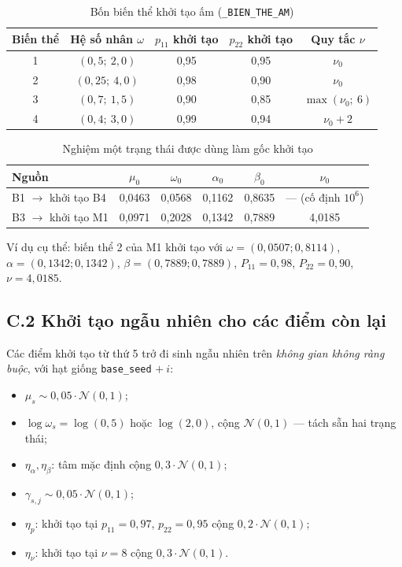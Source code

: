 \documentclass[11pt,a4paper]{article}
\begin{document}
\begin{table}[H]\centering\footnotesize
\caption{Bốn biến thể khởi tạo ấm (\texttt{\_BIEN\_THE\_AM})}
\begin{tabularx}{\textwidth}{c C C C C}
\toprule
\textbf{Biến thể} & \textbf{Hệ số nhân $\omega$} & \textbf{$p_{11}$ khởi tạo} & \textbf{$p_{22}$ khởi tạo} & \textbf{Quy tắc $\nu$} \\
 & $(0{,}5;\ 2{,}0)$ & 0{,}95 & 0{,}95 & $\nu_0$ \\
2 & $(0{,}25;\ 4{,}0)$ & 0{,}98 & 0{,}90 & $\nu_0$ \\
3 & $(0{,}7;\ 1{,}5)$ & 0{,}90 & 0{,}85 & $\max(\nu_0;\ 6)$ \\
4 & $(0{,}4;\ 3{,}0)$ & 0{,}99 & 0{,}94 & $\nu_0+2$ \\
\bottomrule
\end{tabularx}
\end{table}


\begin{table}[H]\centering\footnotesize
\caption{Nghiệm một trạng thái được dùng làm gốc khởi tạo}
\begin{tabularx}{\textwidth}{l C C C C C}
\toprule
\textbf{Nguồn} & $\mu_0$ & $\omega_0$ & $\alpha_0$ & $\beta_0$ & $\nu_0$ \\
\midrule
B1 $\to$ khởi tạo B4 & 0{,}0463 & 0{,}0568 & 0{,}1162 & 0{,}8635 & --- (cố định $10^6$) \\
B3 $\to$ khởi tạo M1 & 0{,}0971 & 0{,}2028 & 0{,}1342 & 0{,}7889 & 4{,}0185 \\
\bottomrule
\end{tabularx}
\end{table}

Ví dụ cụ thể: biến thể 2 của M1 khởi tạo với
$\omega = (0{,}0507; 0{,}8114)$,
$\alpha = (0{,}1342; 0{,}1342)$,
$\beta = (0{,}7889; 0{,}7889)$,
$P_{11} = 0{,}98$, $P_{22} = 0{,}90$, $\nu = 4{,}0185$.

\subsection*{C.2 Khởi tạo ngẫu nhiên cho các điểm còn lại}
Các điểm khởi tạo từ thứ 5 trở đi sinh ngẫu nhiên trên \emph{không gian không ràng buộc},
với hạt giống \texttt{base\_seed} $+\ i$:
\begin{itemize}
  \item $\mu_s \sim 0{,}05\cdot\mathcal{N}(0,1)$;
  \item $\log\omega_s = \log(0{,}5)$ hoặc $\log(2{,}0)$, cộng $\mathcal{N}(0,1)$ --- tách sẵn hai trạng thái;
  \item $\eta_{\alpha}, \eta_{\beta}$: tâm mặc định cộng $0{,}3\cdot\mathcal{N}(0,1)$;
  \item $\gamma_{s,j} \sim 0{,}05\cdot\mathcal{N}(0,1)$;
  \item $\eta_p$: khởi tạo tại $p_{11}=0{,}97$, $p_{22}=0{,}95$ cộng $0{,}2\cdot\mathcal{N}(0,1)$;
  \item $\eta_\nu$: khởi tạo tại $\nu=8$ cộng $0{,}3\cdot\mathcal{N}(0,1)$.
\end{itemize}
\end{document}
